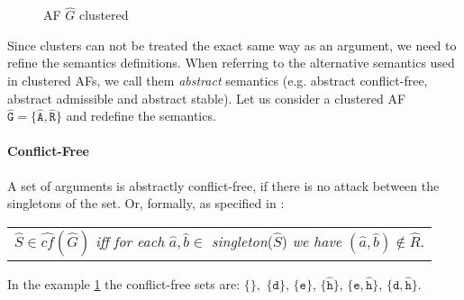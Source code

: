 \begin{figure}[h]
    \centering
    \caption{\ac{AF} $\hat{G}$ clustered}
    \label{af:backgroundExampleClusterSpurious}
\end{figure}


Since clusters can not be treated the exact same way as an argument, we need to refine the semantics definitions. When referring to the alternative semantics used in clustered AFs, we call them \emph{abstract} semantics (e.g. abstract conflict-free, abstract admissible and abstract stable). Let us consider a clustered AF $\mathtt{\hat{G}=\{\hat{A}, \hat{R}\}}$ and redefine the semantics.

\paragraph{Conflict-Free} A set of arguments is abstractly conflict-free, if there is no attack between the singletons of the set. Or, formally, as specified in \cite{DBLP:conf/kr/SaribaturW21}:

\begin{center}
    \begin{tabular}{c}
        $\hat{S} \in \hat{cf}(\hat{G})$ \textit{iff for each} $\hat{a}, \hat{b} \in$ \textit{singleton}($\hat{S}$) \textit{we have} $(\hat{a}, \hat{b}) \not\in \hat{R}$.
    \end{tabular}
\end{center}

In the example \ref{af:backgroundExampleClusterSpurious} the conflict-free sets are:
$\mathtt{\{\}},$
$\mathtt{\{d}\}$,
$\mathtt{\{e}\}$,
$\mathtt{\{\hat{h}}\}$,
$\mathtt{\{e, \hat{h}}\}$,
$\mathtt{\{d, \hat{h}}\}$.



